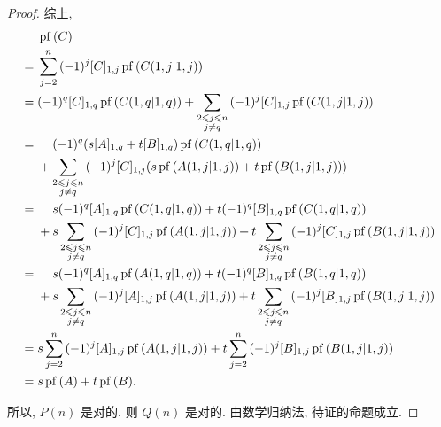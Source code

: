 \documentclass[../libro.tex]{subfiles}
\begin{document}
\begin{proof}
    综上,
    \begin{align*}
        &
        \operatorname{pf} {(C)}
        \\
        = {} &
        \sum_{j=2}^{n}
        {(-1)^j [C]_{1,j}
        \operatorname{pf} {(C({1,j}|{1,j}))}}
        \\
        = {} &
        (-1)^q [C]_{1,q}
        \operatorname{pf} {(C({1,q}|{1,q}))}
        +
        \sum_{\substack{2 \leq j \leq n \\ j \neq q}}
        {(-1)^j [C]_{1,j}
        \operatorname{pf} {(C({1,j}|{1,j}))}}
        \\
        = {} &
        \hphantom{{} + {}}
        (-1)^q (s[A]_{1,q} + t[B]_{1,q})
        \operatorname{pf} {(C({1,q}|{1,q}))}
        \\
        &
        +
        \sum_{\substack{2 \leq j \leq n \\ j \neq q}}
        {(-1)^j [C]_{1,j}
            (s \operatorname{pf} {(A({1,j}|{1,j}))}
            + t \operatorname{pf} {(B({1,j}|{1,j}))})
        }
        \\
        = {} &
        \hphantom{{} + {}}
        s (-1)^q [A]_{1,q}
        \operatorname{pf} {(C({1,q}|{1,q}))}
        + t (-1)^q [B]_{1,q}
        \operatorname{pf} {(C({1,q}|{1,q}))}
        \\
        &
        +
        s \sum_{\substack{2 \leq j \leq n \\ j \neq q}}
        {(-1)^j [C]_{1,j}
            \operatorname{pf} {(A({1,j}|{1,j}))}
        }
        + t \sum_{\substack{2 \leq j \leq n \\ j \neq q}}
        {(-1)^j [C]_{1,j}
            \operatorname{pf} {(B({1,j}|{1,j}))}
        }
        \\
        = {} &
        \hphantom{{} + {}}
        s (-1)^q [A]_{1,q}
        \operatorname{pf} {(A({1,q}|{1,q}))}
        + t (-1)^q [B]_{1,q}
        \operatorname{pf} {(B({1,q}|{1,q}))}
        \\
        &
        +
        s \sum_{\substack{2 \leq j \leq n \\ j \neq q}}
        {(-1)^j [A]_{1,j}
            \operatorname{pf} {(A({1,j}|{1,j}))}
        }
        + t \sum_{\substack{2 \leq j \leq n \\ j \neq q}}
        {(-1)^j [B]_{1,j}
            \operatorname{pf} {(B({1,j}|{1,j}))}
        }
        \\
        = {} &
        s \sum_{j=2}^{n}
        {(-1)^j [A]_{1,j}
            \operatorname{pf} {(A({1,j}|{1,j}))}
        }
        +
        t \sum_{j=2}^{n}
        {(-1)^j [B]_{1,j}
            \operatorname{pf} {(B({1,j}|{1,j}))}
        }
        \\
        = {} &
        s \operatorname{pf} {(A)}
        + t \operatorname{pf} {(B)}.
    \end{align*}

    所以, \(P(n)\) 是对的.
    则 \(Q(n)\) 是对的.
    由数学归纳法, 待证的命题成立.

\end{proof}
\end{document}

